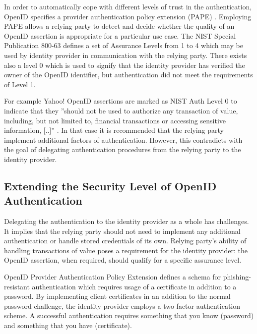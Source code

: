 \documentclass{tktltiki}
\begin{document}
   In order to automatically cope with different levels of trust in the authentication, OpenID specifies a provider authentication policy extension (PAPE) \cite{openid_2.0_specification_07, openid_2.0_pape_07}. Employing PAPE allows a relying party to detect and decide whether the quality of an OpenID assertion is appropriate for a particular use case. The NIST Special Publication 800-63 \cite{NIST_SP800-63} defines a set of Assurance Levels from 1 to 4 which may be used by identity provider in communication with the relying party. There exists also a level 0 which is used to signify that the identity provider has verified the owner of the OpenID identifier, but authentication did not meet the requirements of Level 1.

   For example Yahoo! OpenID assertions are marked as NIST Auth Level 0 to indicate that they ''should not be used to authorize any transaction of value, including, but not limited to, financial transactions or accessing sensitive information, [..]'' \cite{yahoo_openid_bestpractices_2010}. In that case it is recommended that the relying party implement additional factors of authentication. However, this contradicts with the goal of delegating authentication procedures from the relying party to the identity provider.
          
    

\subsection{Extending the Security Level of OpenID Authentication}

    Delegating the authentication to the identity provider as a whole has challenges. It implies that the relying party should not need to implement any additional authentication or handle stored credentials of its own. Relying party's ability of handling transactions of value poses a requirement for the identity provider: the OpenID assertion, when required, should qualify for a specific assurance level.

    OpenID Provider Authentication Policy Extension defines a schema for phishing-resistant authentication \cite{openid_2.0_pape_phishing_07} which requires usage of a certificate in addition to a password. By implementing client certificates in an addition to the normal password challenge, the identity provider employs a two-factor authentication scheme. A successful authentication requires something that you know (password) and something that you have (certificate). 
\end{document}
